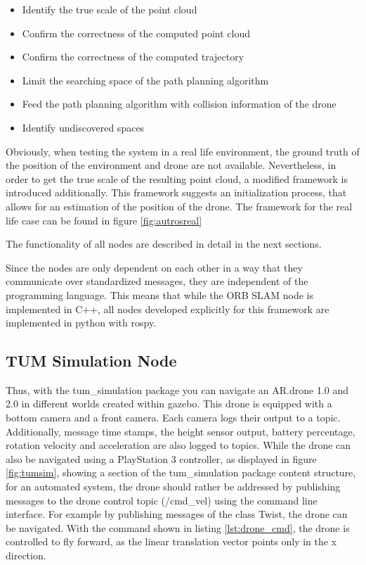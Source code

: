 	\begin{itemize}
	
	\item{Identify the true scale of the point cloud}
	\item{Confirm the correctness of the computed point cloud}
	\item{Confirm the correctness of the computed trajectory}
	\item{Limit the searching space of the path planning algorithm}
	\item{Feed the path planning algorithm with collision information of the drone}
	\item{Identify undiscovered spaces} 
	
	\end{itemize}
	
	
	
	Obviously, when testing the system in a real life environment, the ground truth of the position of the environment and drone are not available. 
	Nevertheless, in order to get the true scale of the resulting point cloud, a modified framework is introduced additionally. This framework suggests an 
	initialization process, that allows for an estimation of the position of the drone. The framework for the real life case can be found in figure \ref{fig:autrosreal}
	
	The functionality of all nodes are described in detail in the next sections. 
	
	Since the nodes are only dependent on each other in a way that they communicate over standardized messages, they are independent of the programming language. 
	This means that while the ORB SLAM node is implemented in C++, all nodes developed explicitly for this framework are implemented in python with rospy. 
	
	\subsection{TUM Simulation Node} \label{tumsec}
	
	
	Thus, with the tum\_simulation package you can navigate an AR.drone 1.0 and 2.0 in different worlds created within gazebo. This drone is equipped with a bottom camera 
	and a front camera. Each camera logs their output to a topic. Additionally, message time stamps, the height sensor output, 
	battery percentage, rotation
	velocity and acceleration are also logged to topics. While the drone can also be navigated using a PlayStation 3 controller, as displayed in figure 
	\ref{fig:tumsim}, showing a section of the tum\_simulation package content structure, 
	for an automated system, the drone should rather be addressed by publishing messages to the drone control topic (/cmd\_vel)
	using the command line interface. For example 
	by publishing messages of the class Twist, the drone can be navigated. With the command shown in listing \ref{lst:drone_cmd}, the drone is 
	controlled to fly forward, as the linear translation vector points only in the x direction.  
	
